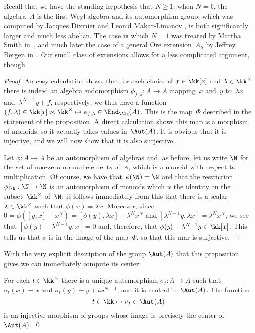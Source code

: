 Recall that we have the standing hypothesis that $N\geq1$: when $N=0$, the
algebra~$A$ is the first Weyl algebra and its automorphism group, which was
computed by Jacques Dixmier \cite{Dixmier:3} and Leonid Makar-Limanov
\cite{ML}, is both significantly larger and much less abelian. The case in
which $N=1$ was treated by Martha Smith in~\cite{Smith}, and much later the
case of a general Ore extension~$A_h$ by Jeffrey Bergen in~\cite{Bergen}. 
Our small class of extensions allows for a less complicated argument,
though.

\begin{proof}
An easy calculation shows that for each choice of $f\in\kk[x]$ and
$\lambda\in\kk^\times$ there is indeed an algebra endomorphism
$\phi_{f,\lambda}:A\to A$ mapping~$x$ and~$y$ to~$\lambda x$
and~$\lambda^{N-1}y+f$, respectively: we thus have a function
$(f,\lambda)\in\kk[x]\bowtie\kk^\times
\mapsto\phi_{f,\lambda}\in\End_{\Alg}(A)$. This is the map~$\Phi$ described
in the statement of the proposition. A direct calculation shows this map is
a morphism of monoids, so it actually takes values in~$\Aut(A)$. It is
obvious that it is injective, and we will now show that it is also
surjective.

Let $\phi:A\to A$ be an automorphism of algebras and, as before, let us
write $\N$ for the set of non-zero normal elements of~$A$, which is a
monoid with respect to multiplication. Of course, we have
that~$\phi(\N)=\N$ and that the restriction~$\phi|_\N:\N\to\N$ is an
automorphism of monoids which is the identity on the subset~$\kk^\times$
of~$\N$: it follows immediately from this that there is a
scalar~$\lambda\in\kk^\times$ such that $\phi(x)=\lambda x$. Moreover,
since $0=\phi([y,x]-x^N)=[\phi(y),\lambda x]-\lambda^Nx^N$ and
$[\lambda^{N-1}y,\lambda x]=\lambda^Nx^N$, we see that
$[\phi(y)-\lambda^{N-1}y,x]=0$ and, therefore, that
$\phi(y)-\lambda^{N-1}y\in\kk[x]$. This tells us that $\phi$ is in the
image of the map~$\Phi$, so that this mar is surjective.
\end{proof}

With the very explicit description of the group $\Aut(A)$ that this
proposition gives we can immediately compute its center:

\begin{Corollary}\label{coro:center}
For each $t\in\kk^\times$ there is a unique automorphism $\sigma_t:A\to A$
such that $\sigma_t(x)=x$ and $\sigma_t(y)=y+tx^{N-1}$, and it is central
in~$\Aut(A)$. The function
  \[
  t\in\kk\mapsto\sigma_t\in\Aut(A)
  \]
is an injective morphism of groups whose image is precisely the center
of~$\Aut(A)$. \qed
\end{Corollary}

